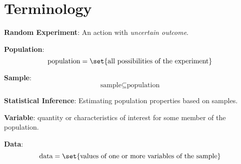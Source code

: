 \section*{Terminology}

\textbf{Random Experiment}: An action with \textit{uncertain outcome}.

\textbf{Population}:
\begin{equation*}
    \text{population} = \set{ \text{all possibilities of the experiment} }
\end{equation*}

\textbf{Sample}:
\begin{equation*}
    \text{sample} \subseteq \text{population}
\end{equation*}

\textbf{Statistical Inference}: Estimating population properties based on samples.

\textbf{Variable}: quantity or characteristics of interest for some member of the population.

\textbf{Data}:
\begin{equation*}
    \text{data} = \set{ \text{values of one or more variables of the sample} }
\end{equation*}
